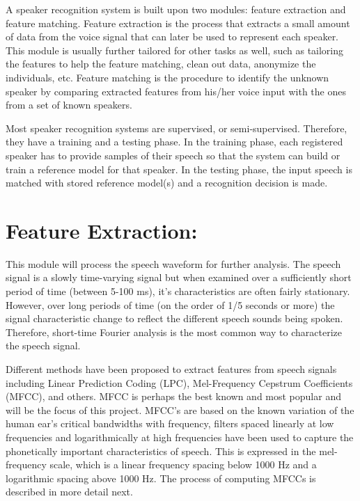 \documentclass{article}
\begin{document}
A speaker recognition system is built upon two modules: feature extraction and feature matching. Feature extraction is the process that extracts a small amount of data from the voice signal that can later be used to represent each speaker. This module is usually further tailored for other tasks as well, such as tailoring the features to help the feature matching, clean out data, anonymize the individuals, etc. Feature matching is the procedure to identify the unknown speaker by comparing extracted features from his/her voice input with the ones from a set of known speakers. 

Most speaker recognition systems are supervised, or semi-supervised. Therefore, they have a training and a testing phase. In the training phase, each registered speaker has to provide samples of their speech so that the system can build or train a reference model for that speaker. In the testing phase, the input speech is matched with stored reference model(s) and a recognition decision is made.

\section{Feature Extraction:}
This module will process the speech waveform for further analysis. The speech signal is a slowly time-varying signal but when examined over a sufficiently short period of time (between 5-100 ms), it's characteristics are often fairly stationary. However, over long periods of time (on the order of 1/5 seconds or more) the signal characteristic change to reflect the different speech sounds being spoken. Therefore, short-time Fourier analysis is the most common way to characterize the speech signal.

Different methods have been proposed to extract features from speech signals including Linear Prediction Coding (LPC), Mel-Frequency Cepstrum Coefficients (MFCC), and others.  MFCC is perhaps the best known and most popular and will be the focus of this project. MFCC's are based on the known variation of the human ear's critical bandwidths with frequency, filters spaced linearly at low frequencies and logarithmically at high frequencies have been used to capture the phonetically important characteristics of speech.  This is expressed in the mel-frequency scale, which is a linear frequency spacing below 1000 Hz and a logarithmic spacing above 1000 Hz.  The process of computing MFCCs is described in more detail next.
\end{document}
